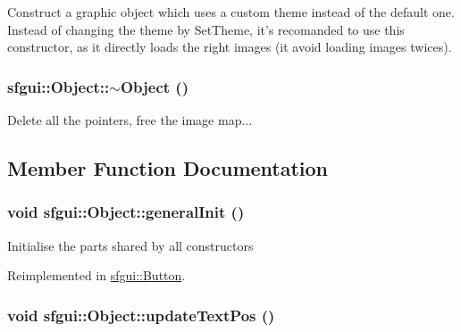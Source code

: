 Construct a graphic object which uses a custom theme instead of the default one. Instead of changing the theme by SetTheme, it's recomanded to use this constructor, as it directly loads the right images (it avoid loading images twices). \hypertarget{classsfgui_1_1Object_7d923592a63a854c77ce4edcb21e40ba}{
\subsubsection[$\sim$Object]{\setlength{\rightskip}{0pt plus 5cm}sfgui::Object::$\sim$Object ()}}
\label{classsfgui_1_1Object_7d923592a63a854c77ce4edcb21e40ba}




Delete all the pointers, free the image map... 

\subsection{Member Function Documentation}
\hypertarget{classsfgui_1_1Object_d2750b3d51a3a208739ed6c0c57df6aa}{
\subsubsection[generalInit]{\setlength{\rightskip}{0pt plus 5cm}void sfgui::Object::generalInit ()}}
\label{classsfgui_1_1Object_d2750b3d51a3a208739ed6c0c57df6aa}




Initialise the parts shared by all constructors 

Reimplemented in \hyperlink{classsfgui_1_1Button_59849e58ed4c46061d71f7172cab4e4e}{sfgui::Button}.\hypertarget{classsfgui_1_1Object_27d9eb8b653f263f76b612cd77512321}{
\subsubsection[updateTextPos]{\setlength{\rightskip}{0pt plus 5cm}void sfgui::Object::updateTextPos ()}}
\label{classsfgui_1_1Object_27d9eb8b653f263f76b612cd77512321}




